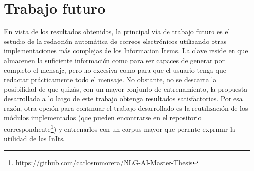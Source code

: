 \section{Trabajo futuro}\label{s:fut}
En vista de los resultados obtenidos, la principal vía de trabajo futuro es el estudio de la redacción automática de correos electrónicos utilizando otras implementaciones más complejas de los Information Items. La clave reside en que almacenen la suficiente información como para ser capaces de generar por completo el mensaje, pero no excesiva como para que el usuario tenga que redactar prácticamente todo el mensaje. No obstante, no se descarta la posibilidad de que quizás, con un mayor conjunto de entrenamiento, la propuesta desarrollada a lo largo de este trabajo obtenga resultados satisfactorios. Por esa razón, otra opción para continuar el trabajo desarrollado es la reutilización de los módulos implementados (que pueden encontrarse en el repositorio correspondiente\footnote{\url{https://github.com/carlosmmorera/NLG-AI-Master-Thesis}}) y entrenarlos con un corpus mayor que permite exprimir la utilidad de los InIts.